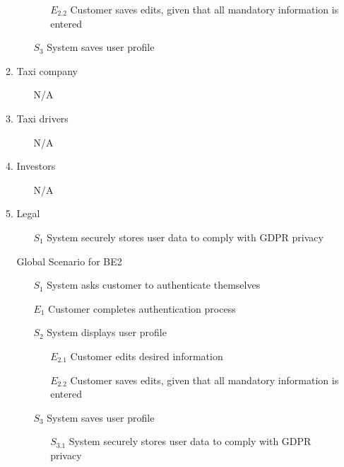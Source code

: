 \documentclass[]{article}
\begin{document}
\begin{enumerate}[{\textbf{BE}}1.]
\begin{enumerate}[{VP2}.1]
\begin{enumerate}
\begin{enumerate}
                    \item[$E_{2.2}$] Customer saves edits, given that all mandatory information is entered
                \end{enumerate}
                \item[$S_3$] System saves user profile
            \end{enumerate}
        \item Taxi company
            \begin{enumerate}
                \item[N/A]
            \end{enumerate}
        \item Taxi drivers
            \begin{enumerate}
                \item[N/A]
            \end{enumerate}
        \item Investors
            \begin{enumerate}
                \item[N/A]
            \end{enumerate}
        \item Legal
            \begin{enumerate}
                \item[$S_1$] System securely stores user data to comply with GDPR privacy
            \end{enumerate}
        \item[Global] Scenario for BE2
            \begin{enumerate}
                \item[$S_1$] System asks customer to authenticate themselves
                    \item[$E_1$] Customer completes authentication process
                \item[$S_2$] System displays user profile
                \begin{enumerate}
                    \item[$E_{2.1}$] Customer edits desired information
                    \item[$E_{2.2}$] Customer saves edits, given that all mandatory information is entered
                \end{enumerate}
                \item[$S_3$] System saves user profile
                \begin{enumerate}
                    \item[$S_{3.1}$] System securely stores user data to comply with GDPR privacy

\end{enumerate}
\end{enumerate}
\end{enumerate}
\end{enumerate}
\end{document}
